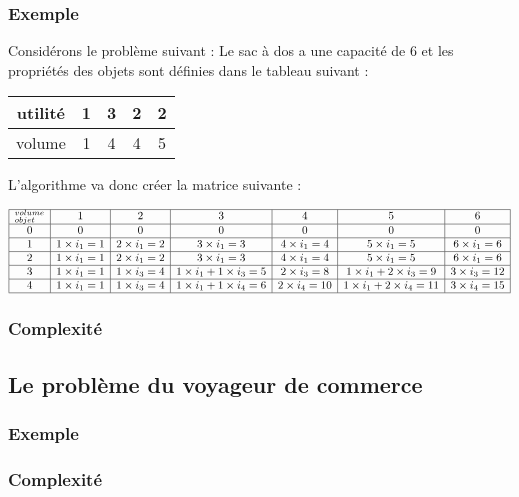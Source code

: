\subsubsection{Exemple}

Considérons le problème suivant :
Le sac à dos a une capacité de 6 et les propriétés des objets sont définies dans le tableau suivant
:
\begin{center}
\begin{tabular}{|c|c|c|c|c|} \hline
	utilité & 1 & 3 & 2 & 2 \\ \hline
	volume & 1 & 4 & 4 & 5 \\ \hline
\end{tabular}
\end{center}

L'algorithme va donc créer la matrice suivante :
\begin{center}
$$\begin{array}{|c|c|c|c|c|c|c|} \hline
  _{objet}^{volume} & 1 & 2 & 3 & 4 & 5 & 6 \\ \hline
	0		  & 0 & 0 & 0 & 0 & 0 & 0 \\ \hline
	1			& 1 \times i_1 = 1 & 2 \times i_1 = 2 & 3 \times i_1 = 3 & 4 \times i_1 = 4 & 5 \times i_1 = 5 & 6 \times i_1 = 6 \\ \hline
	2			& 1 \times i_1 = 1 & 2 \times i_1 = 2 & 3 \times i_1 = 3 & 4 \times i_1 = 4 & 5 \times i_1 = 5 & 6 \times i_1 = 6 \\ \hline
	3			& 1 \times i_1 = 1 & 1 \times i_3 = 4 & 1 \times i_1 + 1 \times i_3 = 5 & 2 \times i_3 = 8 & 1 \times i_1 + 2 \times i_3 = 9 & 3 \times i_3 = 12 \\ \hline
	4			& 1 \times i_1 = 1 & 1 \times i_3 = 4 & 1 \times i_1 + 1 \times i_4 = 6 & 2 \times i_4 = 10
	& 1 \times i_1 + 2 \times i_4 = 11  & 3 \times i_4 = 15 \\ \hline
\end{array}$$
\end{center}




\subsubsection{Complexité}


\subsection{Le problème du voyageur de commerce}
\subsubsection{Exemple}

\subsubsection{Complexité}
